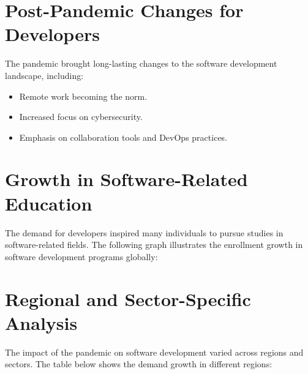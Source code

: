 \documentclass{article}
\begin{document}
\section{Post-Pandemic Changes for Developers}
The pandemic brought long-lasting changes to the software development landscape, including:
\begin{itemize}
    \item Remote work becoming the norm.
    \item Increased focus on cybersecurity.
    \item Emphasis on collaboration tools and DevOps practices.
\end{itemize}

\section{Growth in Software-Related Education}
The demand for developers inspired many individuals to pursue studies in software-related fields. The following graph illustrates the enrollment growth in software development programs globally:


\section{Regional and Sector-Specific Analysis}
The impact of the pandemic on software development varied across regions and sectors. The table below shows the demand growth in different regions:

\end{document}

